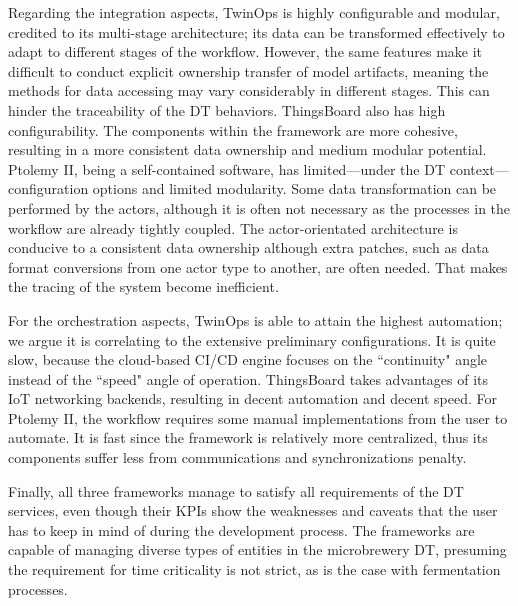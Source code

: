 Regarding the integration aspects, TwinOps is highly configurable and modular, credited to its multi-stage architecture; its data can be transformed effectively to adapt to different stages of the workflow. However, the same features make it difficult to conduct explicit ownership transfer of model artifacts, meaning the methods for data accessing may vary considerably in different stages. This can hinder the traceability of the DT behaviors. ThingsBoard also has high configurability. The components within the framework are more cohesive, resulting in a more consistent data ownership and medium modular potential. Ptolemy II, being a self-contained software, has limited---under the DT context---configuration options and limited modularity. Some data transformation can be performed by the actors, although it is often not necessary as the processes in the workflow are already tightly coupled. The actor-orientated architecture is conducive to a consistent data ownership although extra patches, such as data format conversions from one actor type to another, are often needed. That makes the tracing of the system become inefficient.

For the orchestration aspects, TwinOps is able to attain the highest automation; we argue it is correlating to the extensive preliminary configurations. It is quite slow, because the cloud-based CI/CD engine focuses on the ``continuity" angle instead of the ``speed" angle of operation. ThingsBoard takes advantages of its IoT networking backends, resulting in decent automation and decent speed. For Ptolemy II, the workflow requires some manual implementations from the user to automate. It is fast since the framework is relatively more centralized, thus its components suffer less from communications and synchronizations penalty.

Finally, all three frameworks manage to satisfy all requirements of the DT services, even though their KPIs show the weaknesses and caveats that the user has to keep in mind of during the development process. The frameworks are capable of managing diverse types of entities in the microbrewery DT, presuming the requirement for time criticality is not strict, as is the case with fermentation processes.